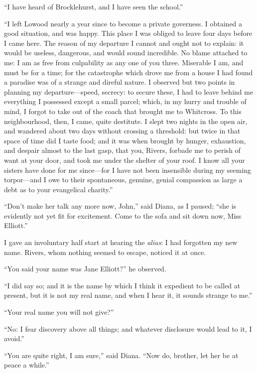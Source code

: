 \enquote{I have heard of \Mr{} Brocklehurst, and I have seen the school.}

\enquote{I left Lowood nearly a year since to become a private
governess. I obtained a good situation, and was happy. This place I
was obliged to leave four days before I came here. The reason of my
departure I cannot and ought not to explain: it would be useless,
dangerous, and would sound incredible. No blame attached to me: I am as
free from culpability as any one of you three. Miserable I am, and must
be for a time; for the catastrophe which drove me from a house I had
found a paradise was of a strange and direful nature. I observed but
two points in planning my departure---speed, secrecy: to secure these, I
had to leave behind me everything I possessed except a small parcel;
which, in my hurry and trouble of mind, I forgot to take out of the
coach that brought me to Whitcross. To this neighbourhood, then, I
came, quite destitute. I slept two nights in the open air, and wandered
about two days without crossing a threshold: but twice in that space of
time did I taste food; and it was when brought by hunger, exhaustion,
and despair almost to the last gasp, that you, \Mr{} Rivers, forbade me to
perish of want at your door, and took me under the shelter of your
roof. I know all your sisters have done for me since---for I have not
been insensible during my seeming torpor---and I owe to their
spontaneous, genuine, genial compassion as large a debt as to your
evangelical charity.}

\enquote{Don't make her talk any more now, \St{} John,} said Diana, as I
paused; \enquote{she is evidently not yet fit for excitement. Come to
the sofa and sit down now, Miss Elliott.}

I gave an involuntary half start at hearing the \emph{alias}: I had
forgotten my new name. \Mr{} Rivers, whom nothing seemed to escape,
noticed it at once.

\enquote{You said your name was Jane Elliott?} he observed.

\enquote{I did say so; and it is the name by which I think it expedient
to be called at present, but it is not my real name, and when I hear it,
it sounds strange to me.}

\enquote{Your real name you will not give?}

\enquote{No: I fear discovery above all things; and whatever disclosure
would lead to it, I avoid.}

\enquote{You are quite right, I am sure,} said Diana. \enquote{Now do,
brother, let her be at peace a while.}

